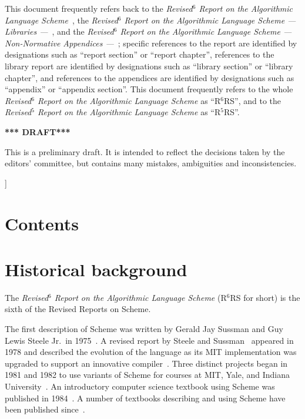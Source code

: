\documentclass[twoside,twocolumn]{algol60}
\newcommand{\rn}[1]{R$^{#1}$RS}
\begin{document}
{This document frequently refers back to the \textit{Revised$^6$ Report
  on the Algorithmic Language Scheme}~\cite{R6RS}, the
\textit{Revised$^6$ Report on the Algorithmic Language Scheme ---
  Libraries ---}~\cite{R6RS-libraries}, and the \textit{Revised$^6$
  Report on the Algorithmic Language Scheme --- Non-Normative
  Appendices ---}~\cite{R6RS-appendices}; specific references to the
report are identified by designations such as ``report section'' or
``report chapter'', references to the library report are identified by
designations such as ``library section'' or ``library chapter'', and
references to the appendices are identified by designations such as
``appendix'' or ``appendix section''.  This document frequently refers
to the whole \textit{Revised$^6$ Report on the Algorithmic Language
  Scheme} as ``\rn{6}'', and to the \textit{Revised$^5$ Report
  on the Algorithmic Language Scheme} as ``\rn{5}''.

\bigskip

\begin{center}
{\large \bf
*** DRAFT*** \\
}\end{center}

This is a preliminary draft.  It is intended to reflect the decisions
taken by the editors' committee, but contains many mistakes,
ambiguities and inconsistencies.

}]

\texonly\clearpage\endtexonly

\chapter*{Contents}
\addvspace{3.5pt}                  %
\renewcommand{\tocshrink}{-4.0pt}  %
{%
\tableofcontents
}

\vfill

\texonly\clearpage\endtexonly


\chapter{Historical background}

The \textit{Revised$^6$ Report on the Algorithmic Language Scheme}
(\rn{6} for short) is the sixth of the Revised Reports on Scheme.

\vest The first description of Scheme was written by Gerald Jay
Sussman and Guy Lewis Steele Jr.\ in
1975~\cite{Scheme75}.  A revised report by Steele and
Sussman~\cite{Scheme78}
appeared in 1978 and described the evolution
of the language as its MIT implementation was upgraded to support an
innovative compiler~\cite{Rabbit}.  Three distinct projects began in
1981 and 1982 to use variants of Scheme for courses at MIT, Yale, and
Indiana University~\cite{Rees82,MITScheme,Scheme311}\nocite{Scheme84}.  An introductory
computer science textbook using Scheme was published in
1984~\cite{SICP}.  A number of textbooks describing and using Scheme
have been published since~\cite{tspl3}.
\end{document}
